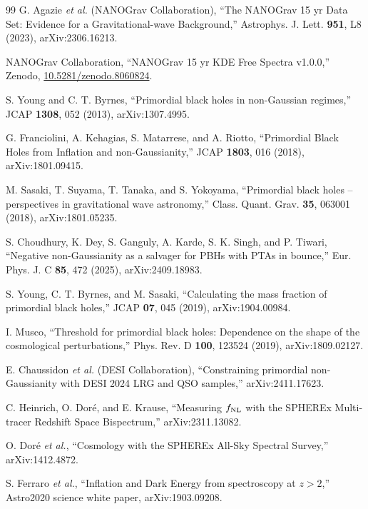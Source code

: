 \documentclass[aps,prd,twocolumn,superscriptaddress,nofootinbib,longbibliography]{revtex4-2}
\begin{document}
\begin{thebibliography}{99}
 G. Agazie \textit{et al.} (NANOGrav Collaboration),
  ``The NANOGrav 15 yr Data Set: Evidence for a Gravitational-wave Background,''
  Astrophys. J. Lett. \textbf{951}, L8 (2023), arXiv:2306.16213.

 NANOGrav Collaboration,
  ``NANOGrav 15 yr KDE Free Spectra v1.0.0,''
  Zenodo, \href{https://doi.org/10.5281/zenodo.8060824}{10.5281/zenodo.8060824}.

 S. Young and C. T. Byrnes,
  ``Primordial black holes in non-Gaussian regimes,'' JCAP \textbf{1308}, 052
  (2013), arXiv:1307.4995.

 G. Franciolini, A. Kehagias, S. Matarrese, and
  A. Riotto, ``Primordial Black Holes from Inflation and non-Gaussianity,''
  JCAP \textbf{1803}, 016 (2018), arXiv:1801.09415.

 M. Sasaki, T. Suyama, T. Tanaka, and S. Yokoyama,
  ``Primordial black holes -- perspectives in gravitational wave astronomy,''
  Class. Quant. Grav. \textbf{35}, 063001 (2018), arXiv:1801.05235.

 S. Choudhury, K. Dey, S. Ganguly, A. Karde,
  S. K. Singh, and P. Tiwari,
  ``Negative non-Gaussianity as a salvager for PBHs with PTAs in bounce,''
  Eur. Phys. J. C \textbf{85}, 472 (2025), arXiv:2409.18983.

 S. Young, C. T. Byrnes, and M. Sasaki,
  ``Calculating the mass fraction of primordial black holes,''
  JCAP \textbf{07}, 045 (2019), arXiv:1904.00984.

 I. Musco, ``Threshold for primordial black holes:
  Dependence on the shape of the cosmological perturbations,''
  Phys. Rev. D \textbf{100}, 123524 (2019), arXiv:1809.02127.

 E. Chaussidon \textit{et al.} (DESI Collaboration),
  ``Constraining primordial non-Gaussianity with DESI 2024 LRG and QSO
  samples,'' arXiv:2411.17623.

 C. Heinrich, O. Dor\'e, and E. Krause,
  ``Measuring $f_{\rm NL}$ with the SPHEREx Multi-tracer Redshift Space
  Bispectrum,'' arXiv:2311.13082.

 O. Dor\'e \textit{et al.},
  ``Cosmology with the SPHEREx All-Sky Spectral Survey,'' arXiv:1412.4872.

 S. Ferraro \textit{et al.},
  ``Inflation and Dark Energy from spectroscopy at $z>2$,''
  Astro2020 science white paper, arXiv:1903.09208.


\end{thebibliography}
\end{document}
